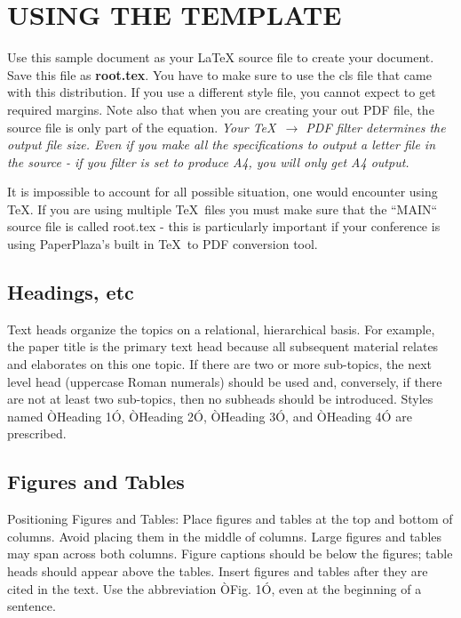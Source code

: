 \documentclass[letterpaper, 10 pt, conference]{ieeeconf}  %
\begin{document}
\section{USING THE TEMPLATE}

Use this sample document as your LaTeX source file to create your document. Save this file as {\bf root.tex}. You have to make sure to use the cls file that came with this distribution. If you use a different style file, you cannot expect to get required margins. Note also that when you are creating your out PDF file, the source file is only part of the equation. {\it Your \TeX\ $\rightarrow$ PDF filter determines the output file size. Even if you make all the specifications to output a letter file in the source - if you filter is set to produce A4, you will only get A4 output. }

It is impossible to account for all possible situation, one would encounter using \TeX. If you are using multiple \TeX\ files you must make sure that the ``MAIN`` source file is called root.tex - this is particularly important if your conference is using PaperPlaza's built in \TeX\ to PDF conversion tool.

\subsection{Headings, etc}

Text heads organize the topics on a relational, hierarchical basis. For example, the paper title is the primary text head because all subsequent material relates and elaborates on this one topic. If there are two or more sub-topics, the next level head (uppercase Roman numerals) should be used and, conversely, if there are not at least two sub-topics, then no subheads should be introduced. Styles named ÒHeading 1Ó, ÒHeading 2Ó, ÒHeading 3Ó, and ÒHeading 4Ó are prescribed.

\subsection{Figures and Tables}

Positioning Figures and Tables: Place figures and tables at the top and bottom of columns. Avoid placing them in the middle of columns. Large figures and tables may span across both columns. Figure captions should be below the figures; table heads should appear above the tables. Insert figures and tables after they are cited in the text. Use the abbreviation ÒFig. 1Ó, even at the beginning of a sentence.
\end{document}
